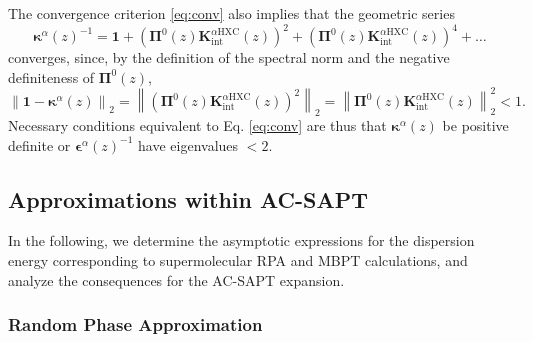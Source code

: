 \documentclass[journal=jctcce,manuscript=article]{achemso}
\begin{document}
The convergence criterion \eqref{eq:conv} also implies that the
geometric series 
\begin{equation}
  \label{eq:giptgen}
  \boldsymbol{\kappa}^\alpha(z)^{-1} = \mathbf{1} +
  \left(\boldsymbol{\Pi}^0(z)
  \mathbf{K}^{\alpha\text{HXC}}_\text{int}(z) \right)^2 +
  \left(\boldsymbol{\Pi}^0(z)
  \mathbf{K}^{\alpha\text{HXC}}_\text{int}(z) \right)^4 + \ldots
\end{equation}
converges, since, by the definition of the spectral norm and the
negative definiteness of $\boldsymbol{\Pi}^0(z)$,
\begin{equation}
  \label{eq:convgen}
  \left\| \mathbf{1} -
    \boldsymbol{\kappa}^\alpha(z) \right\|_2 = \left\| \left(
      \boldsymbol{\Pi}^0(z) \mathbf{K}^{\alpha\text{HXC}}_\text{int}(z)
    \right)^2 \right\|_2 =  \left\| 
      \boldsymbol{\Pi}^0(z) \mathbf{K}^{\alpha\text{HXC}}_\text{int}(z)
     \right\|_2^2 < 1. 
\end{equation}
Necessary conditions equivalent to Eq. \eqref{eq:conv} are thus that
$\boldsymbol{\kappa}^\alpha(z)$ be positive definite or 
$\boldsymbol{\epsilon}^\alpha(z)^{-1}$ have eigenvalues $<2$.

\subsection{Approximations within AC-SAPT}

In the following, we determine the asymptotic expressions for the
dispersion energy corresponding to supermolecular RPA and MBPT
calculations, and analyze the consequences for the AC-SAPT expansion.

\subsubsection{Random Phase Approximation}
\label{sec:rpa}
\end{document}
